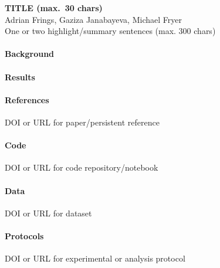 \documentclass[10pt,a4paper]{article} %
\begin{document}
\begin{center}
    {\large\bfseries TITLE (max.\ 30 chars)}\\[0.5em]
    {\small Adrian Frings, Gaziza Janabayeva, Michael Fryer}\\[1em]
    {\small One or two highlight/summary sentences (max. 300 chars)}
\end{center}


\paragraph{Background}

\paragraph{Results}

\paragraph{References}
\begin{enumerate}[label={[\arabic*]}]
    \item DOI or URL for paper/persistent reference
\end{enumerate}

\paragraph{Code}
\begin{enumerate}[label={[\arabic*]}]
    \item DOI or URL for code repository/notebook
\end{enumerate}

\paragraph{Data}
\begin{enumerate}[label={[\arabic*]}]
    \item DOI or URL for dataset
\end{enumerate}

\paragraph{Protocols}
\begin{enumerate}[label={[\arabic*]}]
    \item DOI or URL for experimental or analysis protocol
\end{enumerate}
\end{document}
